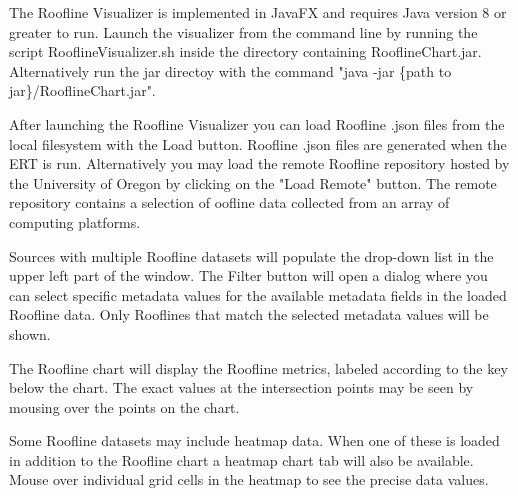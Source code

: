 The Roofline Visualizer is implemented in JavaFX and requires Java version 8 or greater to run. Launch the visualizer from the command line by running the script RooflineVisualizer.sh inside the directory containing RooflineChart.jar. Alternatively run the jar directoy with the command "java -jar \{path to jar\}/RooflineChart.jar".

After launching the Roofline Visualizer you can load Roofline .json files from the local filesystem with the Load button. Roofline .json files are generated when the ERT is run. Alternatively you may load the remote Roofline repository hosted by the University of Oregon by clicking on the "Load Remote" button. The remote repository contains a selection of oofline data collected from an array of computing platforms. 

Sources with multiple Roofline datasets will populate the drop-down list in the upper left part of the window. The Filter button will open a dialog where you can select specific metadata values for the available metadata fields in the loaded Roofline data. Only Rooflines that match the selected metadata values will be shown.

The Roofline chart will display the Roofline metrics, labeled according to the key below the chart. The exact values at the intersection points may be seen by mousing over the points on the chart.

Some Roofline datasets may include heatmap data. When one of these is loaded in addition to the Roofline chart a heatmap chart tab will also be available. Mouse over individual grid cells in the heatmap to see the precise data values.


